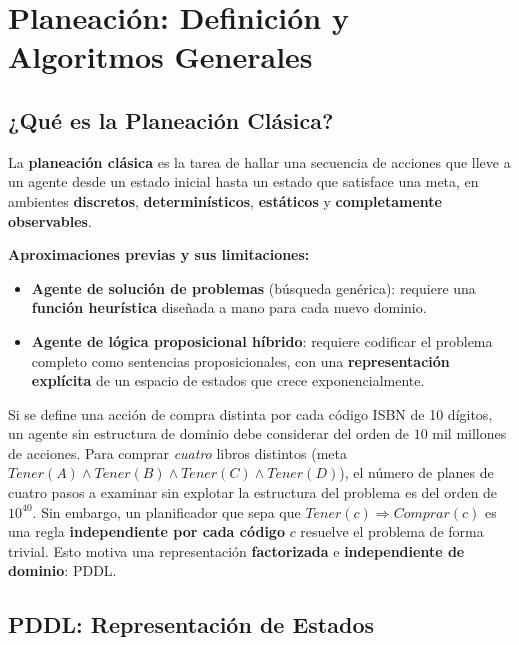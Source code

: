 \section{Planeación: Definición y Algoritmos Generales}

\subsection{¿Qué es la Planeación Clásica?}

\begin{definition}
La \textbf{planeación clásica} es la tarea de hallar una secuencia de acciones que lleve a un agente
desde un estado inicial hasta un estado que satisface una meta, en ambientes \textbf{discretos},
\textbf{determinísticos}, \textbf{estáticos} y \textbf{completamente observables}.
\end{definition}

\textbf{Aproximaciones previas y sus limitaciones:}
\begin{itemize}
    \item \textbf{Agente de solución de problemas} (búsqueda genérica): requiere una \textbf{función
    heurística} diseñada a mano para cada nuevo dominio.
    \item \textbf{Agente de lógica proposicional híbrido}: requiere codificar el problema completo
    como sentencias proposicionales, con una \textbf{representación explícita} de un espacio de
    estados que crece exponencialmente.
\end{itemize}

\begin{example}
Si se define una acción de compra distinta por cada código ISBN de 10 dígitos, un agente sin
estructura de dominio debe considerar del orden de $10$ mil millones de acciones. Para comprar
\emph{cuatro} libros distintos (meta $Tener(A)\land Tener(B)\land Tener(C)\land Tener(D)$), el número
de planes de cuatro pasos a examinar sin explotar la estructura del problema es del orden de
$10^{40}$. Sin embargo, un planificador que sepa que $Tener(c)\Rightarrow Comprar(c)$ es una regla
\textbf{independiente por cada código} $c$ resuelve el problema de forma trivial. Esto motiva una
representación \textbf{factorizada} e \textbf{independiente de dominio}: PDDL.
\end{example}

\subsection{PDDL: Representación de Estados}

